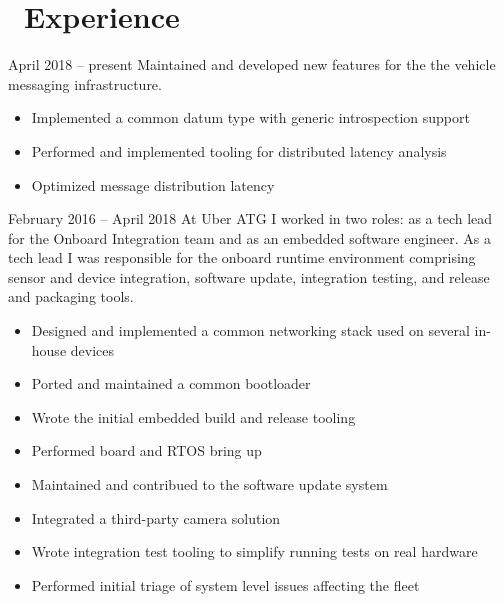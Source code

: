 \documentclass{resume}
\begin{document}


 
\section{\faWrench\ Experience}
          {April 2018 -- present}
Maintained and developed new features for the the vehicle messaging infrastructure.
\begin{itemize}
  \item Implemented a common datum type with generic introspection support
  \item Performed and implemented tooling for distributed latency analysis
  \item Optimized message distribution latency
\end{itemize}
\vspace{3mm}

          {February 2016 -- April 2018}
At Uber ATG I worked in two roles: as a tech lead for the Onboard Integration team and
as an embedded software engineer.  As a tech lead I was responsible for the onboard runtime
environment comprising sensor and device integration, software update, integration testing, and
release and packaging tools.
\begin{itemize}
  \item Designed and implemented a common networking stack used on several in-house devices
  \item Ported and maintained a common bootloader
  \item Wrote the initial embedded build and release tooling
  \item Performed board and RTOS bring up
  \item Maintained and contribued to the software update system
  \item Integrated a third-party camera solution
  \item Wrote integration test tooling to simplify running tests on real hardware
  \item Performed initial triage of system level issues affecting the fleet
\end{itemize}
\vspace{3mm}
\end{document}
